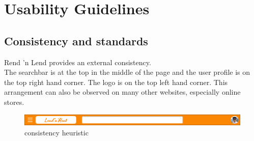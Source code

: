\section{Usability Guidelines}\label{Usability Guidelines}


\subsection{Consistency and standards}\label{consistency}
Rend 'n Lend provides an external consistency. \\
The searchbar is at the top in the middle of the page and the user profile is on the top right hand corner. The logo is on the top left hand corner. This arrangement can also be observed on many other websites, especially online stores. 

	\begin{figure}[H]
		\centering
		\includegraphics[width=\linewidth]{abb/1_usability_guidelines/heuristic_constiency.png}
		\caption{consistency heuristic}
		\label{fig:heuristic_constiency}
	\end{figure}

